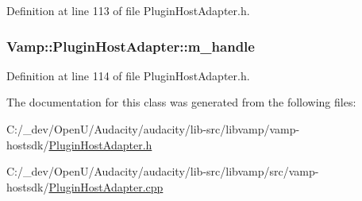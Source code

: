 Definition at line 113 of file Plugin\+Host\+Adapter.\+h.

\subsubsection[{\texorpdfstring{m\+\_\+handle}{m_handle}}]{ Vamp\+::\+Plugin\+Host\+Adapter\+::m\+\_\+handle\hspace{0.3cm}{\ttfamily [protected]}}\hypertarget{class_vamp_1_1_plugin_host_adapter_a02ebd03b226b4a467cad747ce77e79ee}{}\label{class_vamp_1_1_plugin_host_adapter_a02ebd03b226b4a467cad747ce77e79ee}


Definition at line 114 of file Plugin\+Host\+Adapter.\+h.



The documentation for this class was generated from the following files\+:\begin{DoxyCompactItemize}
\item 
C\+:/\+\_\+dev/\+Open\+U/\+Audacity/audacity/lib-\/src/libvamp/vamp-\/hostsdk/\hyperlink{_plugin_host_adapter_8h}{Plugin\+Host\+Adapter.\+h}\item 
C\+:/\+\_\+dev/\+Open\+U/\+Audacity/audacity/lib-\/src/libvamp/src/vamp-\/hostsdk/\hyperlink{_plugin_host_adapter_8cpp}{Plugin\+Host\+Adapter.\+cpp}\end{DoxyCompactItemize}
